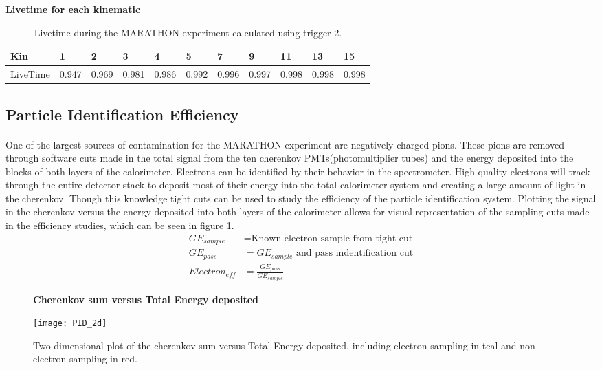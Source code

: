 \begin{table}[]
	\textbf{Livetime for each kinematic }\par\medskip
	\begin{tabular}{|l|l|l|l|l|l|l|l|l|l|l|}
		\hline
		Kin      & 1 & 2 & 3 & 4 & 5 & 7 & 9 & 11 & 13 & 15 \\ \hline
		LiveTime & 0.947 & 0.969 & 0.981 & 0.986 & 0.992 & 0.996 & 0.997 & 0.998  & 0.998  & 0.998\\ \hline
	\end{tabular}
	\caption{Livetime during the MARATHON experiment calculated using trigger 2.  }
	\label{LTtable}
\end{table}
  

\subsection{Particle Identification Efficiency}
\paragraph{} One of the largest sources of contamination for the MARATHON experiment are negatively charged pions. These pions are removed through software cuts made in the total signal from the ten cherenkov PMTs(photomultiplier tubes) and the energy deposited into the blocks of both layers of the calorimeter. Electrons can be identified by their behavior in the spectrometer. High-quality electrons will track through the entire detector stack to deposit most of their energy into the total calorimeter system and creating a large amount of light in the cherenkov. Though this knowledge tight cuts can be used to study the efficiency of the particle identification system. Plotting the signal in the cherenkov versus the energy deposited into both layers of the calorimeter allows for visual representation of the sampling cuts made in the efficiency studies, which can be seen in figure \ref{elesample}. 
\begin{equation}\label{effequ}
\begin{split}
GE_{sample} & = \textrm{Known electron sample from tight cut}  \\
GE_{pass} & = \textrm{$GE_{sample}$ and pass indentification cut} \\
Electron_{eff}  & = \frac{ GE_{pass} } { GE_{sample} } 
\end{split}
\end{equation}
\begin{figure}[]
	\centering
	\textbf{Cherenkov sum versus Total Energy deposited }\par\medskip
	\texttt{[image: PID\_2d]}
	\caption{Two dimensional plot of the cherenkov sum versus Total Energy deposited, including electron sampling in teal and non-electron sampling in red. }
	\label{elesample}
\end{figure}

